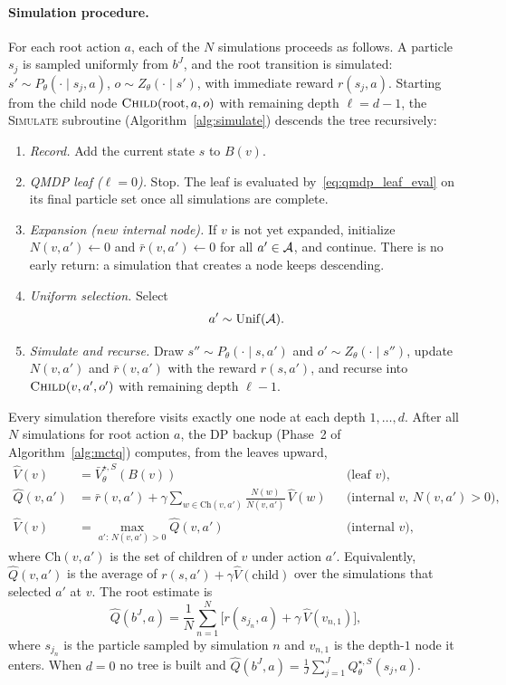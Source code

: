 \paragraph{Simulation procedure.}
For each root action $a$, each of the $N$ simulations proceeds as follows.
A particle $s_j$ is sampled uniformly from $b^J$, and the root transition is simulated: $s'\sim P_\theta(\cdot\mid s_j,a)$, $o\sim Z_\theta(\cdot\mid s')$, with immediate reward $r(s_j,a)$.
Starting from the child node $\textsc{Child}(\mathrm{root},a,o)$ with remaining depth $\ell=d-1$, the \textsc{Simulate} subroutine (Algorithm~\ref{alg:simulate}) descends the tree recursively:
\begin{enumerate}
\item \emph{Record.} Add the current state $s$ to $B(v)$.
\item \emph{QMDP leaf ($\ell=0$).} Stop. The leaf is evaluated by~\eqref{eq:qmdp_leaf_eval} on its final particle set once all simulations are complete.
\item \emph{Expansion (new internal node).} If $v$ is not yet expanded, initialize $N(v,a')\gets0$ and $\bar r(v,a')\gets0$ for all $a'\in{\mathcal{A}}$, and continue. There is no early return: a simulation that creates a node keeps descending.
\item \emph{Uniform selection.} Select
\begin{equation}\label{eq:uniform_action}
a'\sim\mathrm{Unif}({\mathcal{A}}).
\end{equation}
\item \emph{Simulate and recurse.} Draw $s''\sim P_\theta(\cdot\mid s,a')$ and $o'\sim Z_\theta(\cdot\mid s'')$, update $N(v,a')$ and $\bar r(v,a')$ with the reward $r(s,a')$, and recurse into $\textsc{Child}(v,a',o')$ with remaining depth $\ell-1$.
\end{enumerate}
Every simulation therefore visits exactly one node at each depth $1,\ldots,d$.
After all $N$ simulations for root action $a$, the DP backup (Phase~2 of Algorithm~\ref{alg:mctq}) computes, from the leaves upward,
\begin{equation}\label{eq:dp_backup}
\begin{aligned}
\hat V(v)&=\bar V_\theta^{\star,S}(B(v)) &&\text{(leaf $v$)},\\
\hat Q(v,a')&=\bar r(v,a')+\gamma\sum_{w\in\mathrm{Ch}(v,a')}\frac{N(w)}{N(v,a')}\,\hat V(w) &&\text{(internal $v$, $N(v,a')>0$)},\\
\hat V(v)&=\max_{a':\,N(v,a')>0}\hat Q(v,a') &&\text{(internal $v$)},
\end{aligned}
\end{equation}
where $\mathrm{Ch}(v,a')$ is the set of children of $v$ under action $a'$.
Equivalently, $\hat Q(v,a')$ is the average of $r(s,a')+\gamma\hat V(\text{child})$ over the simulations that selected $a'$ at $v$.
The root estimate is
\[
\widehat Q(b^J,a)=\frac{1}{N}\sum_{n=1}^N\bigl[r(s_{j_n},a)+\gamma\,\hat V(v_{n,1})\bigr],
\]
where $s_{j_n}$ is the particle sampled by simulation $n$ and $v_{n,1}$ is the depth-$1$ node it enters.
When $d=0$ no tree is built and $\widehat Q(b^J,a)=\frac1J\sum_{j=1}^J Q_\theta^{\star,S}(s_j,a)$.

